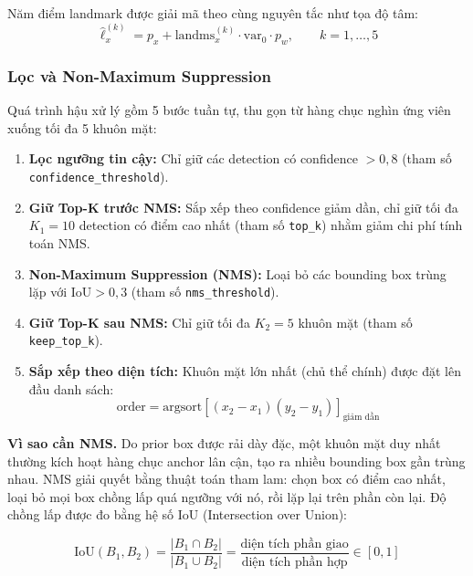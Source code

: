 Năm điểm landmark được giải mã theo cùng nguyên tắc như tọa độ tâm:
\begin{equation}
\label{eq:decode_landmark}
\hat{\ell}_x^{(k)} = p_x + \text{landms}_x^{(k)} \cdot \text{var}_0 \cdot p_w, \qquad k = 1, \dots, 5
\end{equation}

\subsubsection{Lọc và Non-Maximum Suppression}

Quá trình hậu xử lý gồm 5 bước tuần tự, thu gọn từ hàng chục nghìn ứng viên xuống tối đa 5 khuôn mặt:

\begin{enumerate}
    \item \textbf{Lọc ngưỡng tin cậy:} Chỉ giữ các detection có confidence $> 0{,}8$ (tham số \texttt{confidence\_threshold}).
    \item \textbf{Giữ Top-K trước NMS:} Sắp xếp theo confidence giảm dần, chỉ giữ tối đa $K_1 = 10$ detection có điểm cao nhất (tham số \texttt{top\_k}) nhằm giảm chi phí tính toán NMS.
    \item \textbf{Non-Maximum Suppression (NMS):} Loại bỏ các bounding box trùng lặp với $\text{IoU} > 0{,}3$ (tham số \texttt{nms\_threshold}).
    \item \textbf{Giữ Top-K sau NMS:} Chỉ giữ tối đa $K_2 = 5$ khuôn mặt (tham số \texttt{keep\_top\_k}).
    \item \textbf{Sắp xếp theo diện tích:} Khuôn mặt lớn nhất (chủ thể chính) được đặt lên đầu danh sách:
    \begin{equation}
    \label{eq:sort_area}
    \text{order} = \text{argsort}\!\left[(x_2 - x_1)(y_2 - y_1)\right]_{\text{giảm dần}}
    \end{equation}
\end{enumerate}

\textbf{Vì sao cần NMS.} Do prior box được rải dày đặc, một khuôn mặt duy nhất thường kích hoạt hàng chục anchor lân cận, tạo ra nhiều bounding box gần trùng nhau. NMS giải quyết bằng thuật toán tham lam: chọn box có điểm cao nhất, loại bỏ mọi box chồng lấp quá ngưỡng với nó, rồi lặp lại trên phần còn lại. Độ chồng lấp được đo bằng hệ số IoU (Intersection over Union):

\begin{equation}
\label{eq:iou}
\text{IoU}(B_1, B_2) = \frac{|B_1 \cap B_2|}{|B_1 \cup B_2|} = \frac{\text{diện tích phần giao}}{\text{diện tích phần hợp}} \in [0, 1]
\end{equation}


